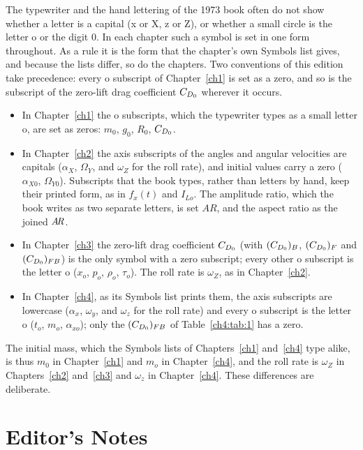 The typewriter and the hand lettering of the 1973 book often do not show whether a letter is a
capital (x or X, z or Z), or whether a small circle is the letter o or the digit 0. In each chapter
such a symbol is set in one form throughout. As a rule it is the form that the chapter's own
Symbols list gives, and because the lists differ, so do the chapters. Two conventions of this
edition take precedence: every o subscript of Chapter~\ref{ch1} is set as a zero, and so is the
subscript of the zero-lift drag coefficient $C_{D_0}$ wherever it occurs.
\begin{itemize}
  \item In Chapter~\ref{ch1} the o subscripts, which the typewriter types as a small letter o, are
    set as zeros: $m_0$, $g_0$, $R_0$, $C_{D_0}$.
  \item In Chapter~\ref{ch2} the axis subscripts of the angles and angular velocities are capitals
    ($\alpha_X$, $\Omega_Y$, and $\omega_Z$ for the roll rate), and initial values carry a zero
    ($\alpha_{X0}$, $\Omega_{Y0}$). Subscripts that the book types, rather than letters by hand,
    keep their printed form, as in $f_x(t)$ and $I_{Lo}$. The amplitude ratio, which the book
    writes as two separate letters, is set $\mathit{AR}$, and the aspect ratio as the joined
    $\mathit{A\mkern-3mu R}$.
  \item In Chapter~\ref{ch3} the zero-lift drag coefficient $C_{D_0}$ (with $(C_{D_0})_B$, $(C_{D_0})_F$
    and $(C_{D_0})_{FB}$) is the only symbol with a zero subscript; every other o subscript is the
    letter o ($x_o$, $p_o$, $\rho_o$, $\tau_o$). The roll rate is $\omega_Z$, as in
    Chapter~\ref{ch2}.
  \item In Chapter~\ref{ch4}, as its Symbols list prints them, the axis subscripts are lowercase
    ($\alpha_x$, $\omega_y$, and $\omega_z$ for the roll rate) and every o subscript is the letter
    o ($t_o$, $m_o$, $\alpha_{xo}$); only the $(C_{D_0})_{FB}$ of Table~\ref{ch4:tab:1} has a zero.
\end{itemize}
The initial mass, which the Symbols lists of Chapters~\ref{ch1} and~\ref{ch4} type alike, is thus
$m_0$ in Chapter~\ref{ch1} and $m_o$ in Chapter~\ref{ch4}, and the roll rate is $\omega_Z$ in
Chapters~\ref{ch2} and~\ref{ch3} and $\omega_z$ in Chapter~\ref{ch4}. These differences are
deliberate.

\section*{Editor's Notes}


